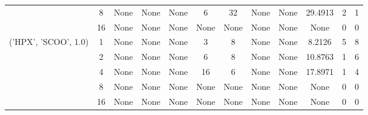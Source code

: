 \begin{tabular}{cccccccccccc}
& 8& None& None& None& 6& 32& None& None& 29.4913& 2& 1\\
& 16& None& None& None& None& None& None& None& None& 0& 0\\
\hline
\multirow{5}{*}{('HPX', 'SCOO', 1.0)}& 1& None& None& None& 3& 8& None& None& 8.2126& 5& 8\\
& 2& None& None& None& 6& 8& None& None& 10.8763& 1& 6\\
& 4& None& None& None& 16& 6& None& None& 17.8971& 1& 4\\
& 8& None& None& None& None& None& None& None& None& 0& 0\\
& 16& None& None& None& None& None& None& None& None& 0& 0\\
\hline
\end{tabular}



